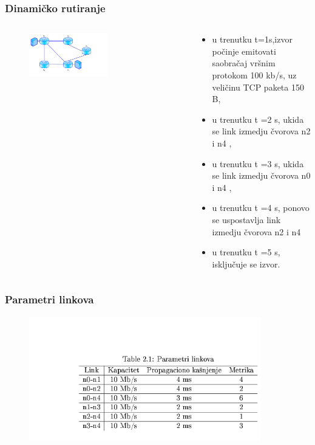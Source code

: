 \documentclass{beamer}
\begin{document}
\begin{frame}
\frametitle{Dinami\v cko rutiranje}

\begin{columns}[T]
   \begin{column}{.5\textwidth}
\begin{figure}[t]
		\includegraphics[width=0.6\textwidth]{slike/nov1.png}
\end{figure}
 \end{column}

\begin{column}{.5\textwidth}

   \bigskip
   
   \bigskip
   
  \begin{block}{}
\begin{itemize}

	\item u trenutku t=1s,izvor po\v cinje emitovati saobra\v caj vr\v snim protokom 100 kb/s,
uz veli\v cinu TCP paketa 150 B,
\item u trenutku t =2 s, ukida se link izmedju \v cvorova n2 i n4 ,
\item u trenutku t =3 s, ukida se link izmedju \v cvorova n0 i n4 ,
\item u trenutku t =4 s, ponovo se uspostavlja link izmedju \v cvorova n2 i n4
\item u trenutku t =5 s, isklju\v cuje se izvor.\\
  \end{itemize}
\end{block}{}
\end{column}
\end{columns}

\end{frame}


\begin{frame}
\frametitle{Parametri linkova}
\begin{figure}[t]
\includegraphics[width=0.9\textwidth]{slike/table.png}
\end{figure}

\end{frame}
\end{document}
